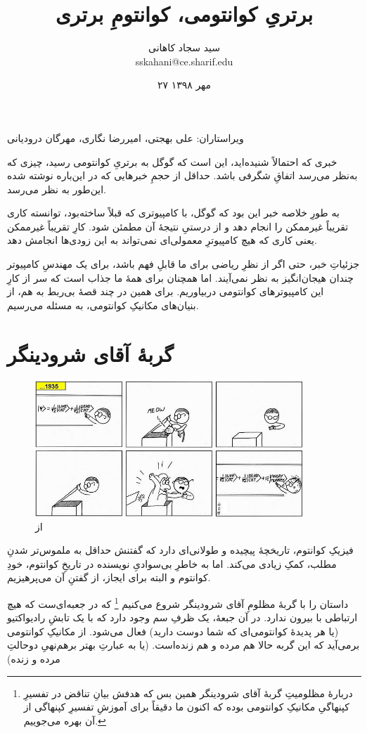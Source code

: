 \documentclass[11pt]{article}
\title{برتریِ کوانتومی، کوانتومِ برتری}
\author{سید سجاد کاهانی \\ sskahani@ce.sharif.edu}
\date{۲۷ مهر ۱۳۹۸}
\begin{document}
\maketitle
ویراستاران: علی بهجتی، امیررضا نگاری، مهرگان درودیانی

خبری که احتمالاً شنیده‌اید، این است که گوگل به برتریِ کوانتومی رسید، چیزی که به‌نظر می‌رسد اتفاقِ شگرفی باشد. حداقل از حجمِ خبرهایی که در این‌باره نوشته شده این‌طور به نظر می‌رسد.

به طورِ خلاصه خبر این بود که گوگل، با کامپیوتری که قبلاً ساخته‌بود، توانسته کاری تقریباً غیرممکن را انجام دهد و از درستیِ نتیجهٔ آن مطمئن شود. کارِ تقریباً غیرممکن یعنی کاری که هیچ کامپیوترِ معمولی‌ای نمی‌تواند به این زودی‌ها انجامش دهد.

جزئیاتِ خبر، حتی اگر از نظرِ ریاضی برای ما قابلِ فهم باشد، برای یک مهندسِ کامپیوتر چندان هیجان‌انگیز به نظر نمی‌آیند. اما همچنان برای همهٔ‌ ما جذاب است که سر از کارِ این کامپیوترهای کوانتومی دربیاوریم. برای همین در چند قصهٔ بی‌ربط به هم، از بنیان‌های مکانیکِ کوانتومی، به مسئله می‌رسیم.

\section{گربهٔ آقای شرودینگر}

\begin{figure}[H]
\centering
\includegraphics[width=0.9\textwidth]{res/schrodinger_miscalc.png}
\caption{از \cite{goose}}
\end{figure}

فیزیکِ کوانتوم، تاریخچهٔ پیچیده و طولانی‌ای دارد که گفتنش حداقل به ملموس‌تر شدنِ مطلب، کمکِ زیادی می‌کند. اما به خاطرِ بی‌سوادیِ نویسنده در تاریخِ کوانتوم، خودِ کوانتوم و البته برای ایجاز، از گفتنِ آن می‌پرهیزیم.

داستان را با گربهٔ مظلومِ آقای شرودینگر شروع می‌کنیم
\footnote{دربارهٔ مظلومیتِ گربهٔ آقای شرودینگر همین بس که هدفش بیانِ تناقض در تفسیرِ کپنهاگیِ مکانیکِ کوانتومی بوده \cite{schrodinger} که اکنون ما دقیقاً برای آموزشِ تفسیرِ کپنهاگی از آن بهره می‌جوییم.}
 که در جعبه‌ای‌ست که هیچ ارتباطی با بیرون ندارد. در آن جبعهٔ، یک ظرفِ سم وجود دارد که با یک تابشِ رادیواکتیو (یا هر پدیدهٔ کوانتومی‌ای که شما دوست دارید) فعال می‌شود. از مکانیکِ کوانتومی برمی‌آید که این گربه حالا هم مرده و هم زنده‌است. (یا به عبارتِ بهتر برهم‌نهیِ دوحالتِ مرده و زنده)
\end{document}
